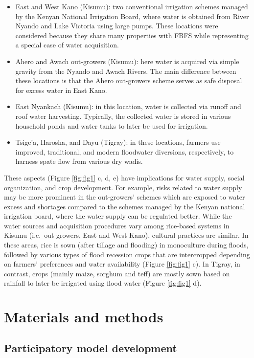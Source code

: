 \documentclass[]{elsarticle} %
\begin{document}
\begin{itemize}
\item
  East and West Kano (Kisumu): two conventional irrigation schemes managed by the Kenyan National Irrigation Board, where water is obtained from River Nyando and Lake Victoria using large pumps. These locations were considered because they share many properties with FBFS while representing a special case of water acquisition.
\item
  Ahero and Awach out-growers (Kisumu): here water is acquired via simple gravity from the Nyando and Awach Rivers. The main difference between these locations is that the Ahero out-growers scheme serves as safe disposal for excess water in East Kano.
\item
  East Nyankach (Kisumu): in this location, water is collected via runoff and roof water harvesting. Typically, the collected water is stored in various household ponds and water tanks to later be used for irrigation.
\item
  Tsige'a, Harosha, and Dayu (Tigray): in these locations, farmers use improved, traditional, and modern floodwater diversions, respectively, to harness spate flow from various dry wadis.
\end{itemize}

These aspects (Figure \ref{fig:fig1} c, d, e) have implications for water supply, social organization, and crop development. For example, risks related to water supply may be more prominent in the out-growers' schemes which are exposed to water excess and shortages compared to the schemes managed by the Kenyan national irrigation board, where the water supply can be regulated better. While the water sources and acquisition procedures vary among rice-based systems in Kisumu (i.e.~out-growers, East and West Kano), cultural practices are similar. In these areas, rice is sown (after tillage and flooding) in monoculture during floods, followed by various types of flood recession crops that are intercropped depending on farmers' preferences and water availability (Figure \ref{fig:fig1} c). In Tigray, in contrast, crops (mainly maize, sorghum and teff) are mostly sown based on rainfall to later be irrigated using flood water (Figure \ref{fig:fig1} d).

\hypertarget{ref3}{%
\section{Materials and methods}\label{ref3}}

\hypertarget{ref31}{%
\subsection{Participatory model development}\label{ref31}}
\end{document}
